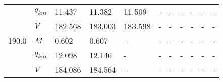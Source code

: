 \begin{tabular}{|l|l|lllllllll|}
      & $q_{km}$ &                    11.437 &   11.382\cellcolor{green} &                    11.509 &                         - &                         - &                         - &                         - &                         - &                         - \\
      & $V$ &                   182.568 &  183.003\cellcolor{green} &                   183.598 &                         - &                         - &                         - &                         - &                         - &                         - \\
\hline
190.0 & $M$ &    0.602\cellcolor{green} &                     0.607 &                         - &                         - &                         - &                         - &                         - &                         - &                         - \\
      & $q_{km}$ &   12.098\cellcolor{green} &                    12.146 &                         - &                         - &                         - &                         - &                         - &                         - &                         - \\
      & $V$ &  184.086\cellcolor{green} &                   184.564 &                         - &                         - &                         - &                         - &                         - &                         - &                         - \\
\hline
\end{tabular}